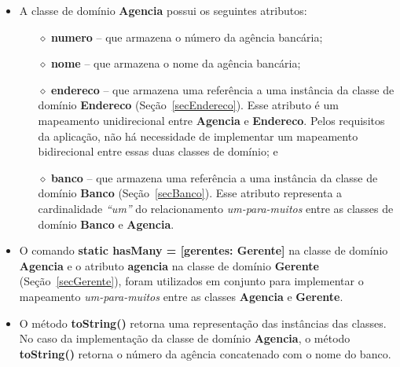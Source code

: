 \begin{itemize}

\item A classe de domínio {\bf Agencia} possui os seguintes atributos:

\vspace{0.5cm}

\begin{itemize}

\item[$\diamond$] {\bf numero} -- que armazena o número da agência bancária; 

\vspace{0.5cm}

\item[$\diamond$] {\bf nome} -- que armazena o nome da agência bancária; 

\vspace{0.5cm}

\item[$\diamond$] {\bf endereco} -- que  armazena uma referência a uma instância
  da classe de domínio  {\bf Endereco} (Seção~\ref{secEndereco}).  Esse atributo
  é um  mapeamento unidirecional  entre {\bf Agencia}  e {\bf  Endereco}.  Pelos
  requisitos  da aplicação,  não  há necessidade  de  implementar um  mapeamento
  bidirecional entre essas duas classes de domínio; e

\vspace{0.5cm}

\item[$\diamond$] {\bf banco} -- que  armazena uma referência a uma instância da
  classe   de  domínio  {\bf   Banco}  (Seção~\ref{secBanco}).    Esse  atributo
  representa a cardinalidade {\em ``um''} do relacionamento {\em um-para-muitos}
  entre as classes de domínio {\bf Banco} e {\bf Agencia}.

\end{itemize}

\vspace{0.5cm}

\item O comando {\bf static hasMany  = [gerentes: Gerente]} na classe de domínio
  {\bf Agencia}  e o atributo {\bf  agencia} na classe de  domínio {\bf Gerente}
  (Seção~\ref{secGerente}),  foram  utilizados em  conjunto  para implementar  o
  mapeamento  {\em  um-para-muitos}  entre  as  classes  {\bf  Agencia}  e  {\bf
    Gerente}.

\vspace{0.5cm}

\item O  método {\bf  toString()} retorna uma  representação das  instâncias das
  classes.   No caso  da implementação  da classe  de domínio  {\bf  Agencia}, o
  método {\bf toString()} retorna o número  da agência concatenado com o nome do
  banco.

\end{itemize}

